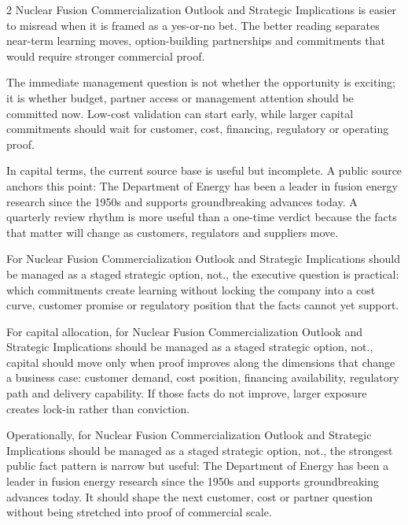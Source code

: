 \documentclass[10pt,a4paper]{article}
\begin{document}
\begin{multicols}{2}
{\small Nuclear Fusion Commercialization Outlook and Strategic Implications is easier to misread when it is framed as a yes-or-no bet. The better reading separates near-term learning moves, option-building partnerships and commitments that would require stronger commercial proof.}\par
{\small The immediate management question is not whether the opportunity is exciting; it is whether budget, partner access or management attention should be committed now. Low-cost validation can start early, while larger capital commitments should wait for customer, cost, financing, regulatory or operating proof.}\par
{\small In capital terms, the current source base is useful but incomplete. A public source anchors this point: The Department of Energy has been a leader in fusion energy research since the 1950s and supports groundbreaking advances today. A quarterly review rhythm is more useful than a one-time verdict because the facts that matter will change as customers, regulators and suppliers move.}\par
{\small For Nuclear Fusion Commercialization Outlook and Strategic Implications should be managed as a staged strategic option, not., the executive question is practical: which commitments create learning without locking the company into a cost curve, customer promise or regulatory position that the facts cannot yet support.}\par
{\small For capital allocation, for Nuclear Fusion Commercialization Outlook and Strategic Implications should be managed as a staged strategic option, not., capital should move only when proof improves along the dimensions that change a business case: customer demand, cost position, financing availability, regulatory path and delivery capability. If those facts do not improve, larger exposure creates lock-in rather than conviction.}\par
{\small Operationally, for Nuclear Fusion Commercialization Outlook and Strategic Implications should be managed as a staged strategic option, not., the strongest public fact pattern is narrow but useful: The Department of Energy has been a leader in fusion energy research since the 1950s and supports groundbreaking advances today. It should shape the next customer, cost or partner question without being stretched into proof of commercial scale.}\par
\end{multicols}
\label{chap:7:end}
\end{document}
